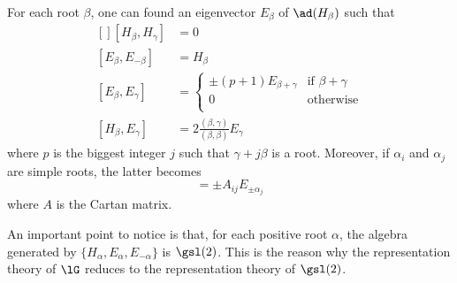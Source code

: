 \begin{theorem}
	For each root $\beta$, one can found an eigenvector $E_{\beta}$ of $\ad(H_{\beta})$ such that
	\begin{equation}            \label{EqChevalleyBasis}
		\begin{aligned}[]
			[H_{\beta},H_{\gamma}] & =  0                                                 \\
			[E_{\beta},E_{-\beta}] & =  H_{\beta}                                         \\
			[E_{\beta},E_{\gamma}] & =
			\begin{cases}
				\pm(p+1)E_{\beta+\gamma} & \text{if }\beta+\gamma \\
				0                        & \text{otherwise}       \\
			\end{cases}                             \\
			[H_{\beta},E_{\gamma}] & =2\frac{ (\beta,\gamma) }{ (\beta,\beta) }E_{\gamma}
		\end{aligned}
	\end{equation}
	where $p$ is the biggest integer $j$ such that $\gamma+j\beta$ is a root. Moreover, if $\alpha_i$ and $\alpha_j$ are simple roots, the latter becomes
	\begin{equation}
		[H_{\alpha_i},E_{\pm\alpha_j}]=\pm A_{ij}E_{\pm\alpha_j}
	\end{equation}
	where $A$ is the Cartan matrix.
\end{theorem}

An important point to notice is that, for each positive root $\alpha$, the algebra generated by $\{ H_{\alpha},E_{\alpha},E_{-\alpha} \}$ is $\gsl(2)$. This is the reason why the representation theory of $\lG$ reduces to the representation theory of $\gsl(2)$.
